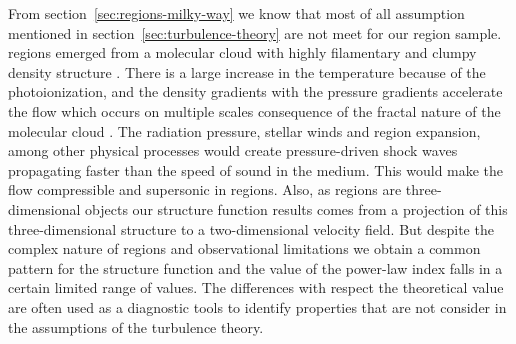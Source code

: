 From section~\ref{sec:regions-milky-way} we know that most of all assumption mentioned in section~\ref{sec:turbulence-theory} are not meet for our \hii{} region sample.
\hii{} regions emerged from a molecular cloud with highly filamentary and clumpy density structure .
There is a large increase in the temperature because of the photoionization, and the density gradients with the pressure gradients accelerate the flow which occurs on multiple scales consequence of the fractal nature of the molecular cloud \citep{arthur2016turbulence}.
The radiation pressure, stellar winds and region expansion, among other physical processes would create pressure-driven shock waves propagating faster than the speed of sound in the medium.
This would make the flow compressible and supersonic in \hii{} regions.
Also, as \hii{} regions are three-dimensional objects our structure function results comes from a projection of this three-dimensional structure to a two-dimensional velocity field.
But despite the complex nature of \hii{} regions and observational limitations we obtain a common pattern for the structure function and the value of the power-law index falls in a certain limited range of values. 
The differences with respect the theoretical value are often used as a diagnostic tools to identify properties that are not consider in the assumptions of the turbulence theory.






